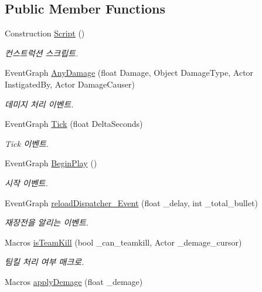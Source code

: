 \subsection*{Public Member Functions}
\begin{DoxyCompactItemize}
\item 
Construction \hyperlink{class_person___character_adf2ca5624b90380520fc5b3d216f2dc8}{Script} ()
\begin{DoxyCompactList}\small\item\em 컨스트럭션 스크립트. \end{DoxyCompactList}\item 
Event\+Graph \hyperlink{class_person___character_a7e5f3df07b9a156ad0eceb1f6c8e615c}{Any\+Damage} (float Damage, Object Damage\+Type, Actor Instigated\+By, Actor Damage\+Causer)
\begin{DoxyCompactList}\small\item\em 데미지 처리 이벤트. \end{DoxyCompactList}\item 
Event\+Graph \hyperlink{class_person___character_a49833f356173ccfe8857fcbc8e7cf2ad}{Tick} (float Delta\+Seconds)
\begin{DoxyCompactList}\small\item\em Tick 이벤트. \end{DoxyCompactList}\item 
Event\+Graph \hyperlink{class_person___character_a1819d7afedae25bd00de25ee22791bb3}{Begin\+Play} ()
\begin{DoxyCompactList}\small\item\em 시작 이벤트. \end{DoxyCompactList}\item 
Event\+Graph \hyperlink{class_person___character_a72fb7de186f6b9c0091062998673bfe1}{reload\+Dispatcher\+\_\+\+Event} (float \+\_\+delay, int \+\_\+total\+\_\+bullet)
\begin{DoxyCompactList}\small\item\em 재장전을 알리는 이벤트. \end{DoxyCompactList}\item 
Macros \hyperlink{class_person___character_ab255a951f0403e71fac4d2660b692204}{is\+Team\+Kill} (bool \+\_\+can\+\_\+teamkill, Actor \+\_\+demage\+\_\+cursor)
\begin{DoxyCompactList}\small\item\em 팀킬 처리 여부 매크로. \end{DoxyCompactList}\item 
Macros \hyperlink{class_person___character_af2ac7f312634c0f8c2c889cd7dd55c01}{apply\+Demage} (float \+\_\+demage)

\end{DoxyCompactItemize}
